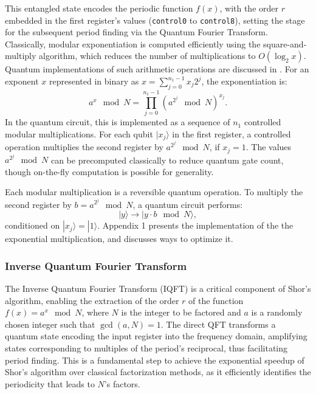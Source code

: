 \documentclass[conference,twoside]{IEEEtran}
\begin{document}
This entangled state encodes the periodic function \( f(x) \), with the order \( r \) embedded in the first register's values (\texttt{control0} to \texttt{control8}), setting the stage for the subsequent period finding via the Quantum Fourier Transform. 
Classically, modular exponentiation is computed efficiently using the square-and-multiply algorithm, which reduces the number of multiplications to \( O(\log_2 x) \). Quantum implementations of such arithmetic operations are discussed in \citep*{vedral1996}. For an exponent \( x \) represented in binary as \( x = \sum_{j=0}^{n_1-1} x_j 2^j \), the exponentiation is:
\begin{equation}
a^x \mod N = \prod_{j=0}^{n_1-1} (a^{2^j} \mod N)^{x_j}.
\end{equation}
In the quantum circuit, this is implemented as a sequence of \( n_1 \) controlled modular multiplications. For each qubit \( |x_j\rangle \) in the first register, a controlled operation multiplies the second register by \( a^{2^j} \mod N \),  if \( x_j = 1 \). The values \( a^{2^j} \mod N \) can be precomputed classically to reduce quantum gate count, though on-the-fly computation is possible for generality.

Each modular multiplication is a reversible quantum operation. To multiply the second register by \( b = a^{2^j} \mod N \), a quantum circuit performs:
\begin{equation}
|y\rangle \to |y \cdot b \mod N\rangle,
\end{equation}
conditioned on \( |x_j\rangle = |1\rangle \).
Appendix 1 presents the implementation of the the exponential multiplication, and discusses ways to optimize it.
\\
\subsubsection{Inverse Quantum Fourier Transform}
The Inverse Quantum Fourier Transform (IQFT) is a critical component of Shor's algorithm, enabling the extraction of the order \( r \) of the function \( f(x) = a^x \mod N \), where \( N \) is the integer to be factored and \( a \) is a randomly chosen integer such that \( \gcd(a, N) = 1 \). The direct QFT transforms a quantum state encoding the input register into the frequency domain, amplifying states corresponding to multiples of the period's reciprocal, thus facilitating period finding. This is a fundamental step to achieve the exponential speedup of Shor's algorithm over classical factorization methods, as it efficiently identifies the periodicity that leads to \( N \)'s factors.
\end{document}

